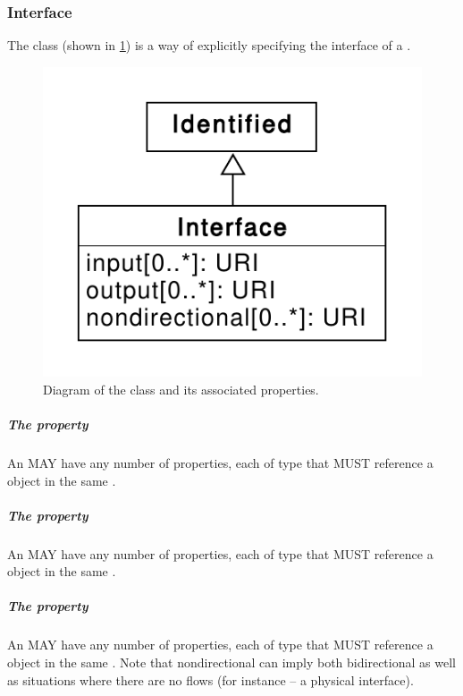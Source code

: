 
\subsubsection{Interface}
\label{sec:Interface}

The  class (shown in \ref{uml:interface}) is a way of explicitly specifying the interface of a . 

\begin{figure}[ht]
\begin{center}
\includegraphics[scale=0.6]{uml/interface}
\caption[]{Diagram of the  class and its associated properties.}
\label{uml:interface}
\end{center}
\end{figure}

\subparagraph{The  property}
\label{sec:input}

An  MAY have any number of  properties, each of type  that MUST reference a  object in the same .

\subparagraph{The  property}
\label{sec:output}

An  MAY have any number of  properties, each of type  that MUST reference a  object in the same .

\subparagraph{The  property}
\label{sec:nondirectional}

An  MAY have any number of  properties, each of type  that MUST reference a  object in the same . Note that nondirectional can imply both bidirectional as well as situations where there are no flows (for instance -- a physical interface).
